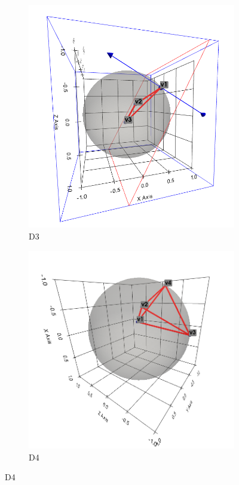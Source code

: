 \begin{figure}[ht]
    \begin{subfigure}[b]{0.4\textwidth}
        \includegraphics[width=\textwidth]{assets/visualisation/D3.png}
        \caption{D3}
        \label{fig:local_descriptor_visualisation_D3}
    \end{subfigure}
    \hfill
    \begin{subfigure}[b]{0.4\textwidth}
        \includegraphics[width=\textwidth]{assets/visualisation/D4.png}
        \caption{D4}
        \label{fig:local_descriptor_visualisation_D4}
    \end{subfigure}
    \hfill


\end{figure}
